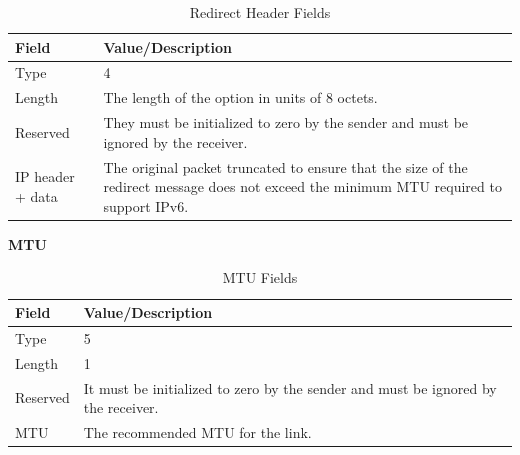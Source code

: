 \documentclass[12pt]{article}
\begin{document}
\begin{savenotes}
\begin{table}[!htpb]
\centering
\begin{tabular}{|L{3.0cm}|L{11.6cm}|}
\hline
Field&Value/Description\\
\hline
Type&4\\
\hline
Length&The length of the option in units of 8 octets.\\
\hline
Reserved&They must be initialized to zero by the sender and must be ignored by the receiver.\\
\hline
IP header + data&The original packet truncated to ensure that the size of the redirect message does not exceed the minimum MTU required to support IPv6.\\
\hline
\end{tabular}
\caption{Redirect Header Fields}
\label{table:redirHead}
\end{table}
\end{savenotes}

\textbf{MTU}

\begin{savenotes}
\begin{table}[!htpb]
\centering
\begin{tabular}{|L{3.0cm}|L{11.6cm}|}
\hline
Field&Value/Description\\
\hline
Type&5\\
\hline
Length&1\\
\hline
Reserved&It must be initialized to zero by the sender and must be ignored by the receiver.\\
\hline
MTU&The recommended MTU for the link.\\
\hline
\end{tabular}
\caption{MTU Fields}
\label{table:mtu}
\end{table}
\end{savenotes}
\end{document}
